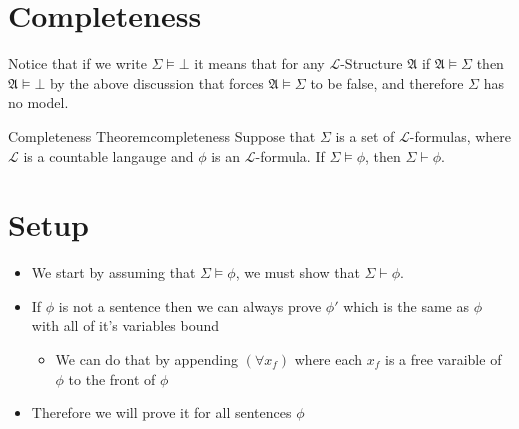 \section{Completeness}














Notice that if we write $ \Sigma \models \bot $ it means that for any $\mathcal{L}$-Structure $ \mathfrak{ A }   $ if $ \mathfrak{ A } \models \Sigma   $ then $ \mathfrak{ A } \models \bot  $ by the above discussion that forces $ \mathfrak{ A } \models \Sigma   $ to be false, and therefore $ \Sigma  $ has no model.


\begin{theorem}{Completeness Theorem}{completeness}
Suppose that $\Sigma$ is a set of $\mathcal{L}$-formulas, where $ \mathcal{L}$ is a countable langauge  and $\phi$ is an $\mathcal{L}$-formula. If $\Sigma \models \phi$, then $\Sigma \vdash \phi$.

\section*{Setup}

\begin{itemize}
    \item We start by assuming that $ \Sigma \models \phi$, we must show that $ \Sigma \vdash \phi$.
    \item If $ \phi$ is not a sentence then we can always prove $ \phi'$ which is the same as $ \phi$ with all of it's variables bound
    \begin{itemize}
        \item We can do that by appending $ \left( \forall  x _{f}  \right)$ where each $ x_{f}$  is a free varaible of $ \phi$ to the front of $ \phi$ 
    \end{itemize}
\item Therefore we will prove it for all sentences $ \phi$ %
\end{itemize}

\end{theorem}

